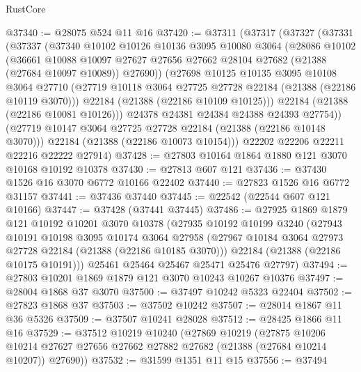 \begin{lexlean}{RustCore}
\begin{coremodule}
@37340 := @28075 @524 @11 @16
@37420 := @37311
    (@37317
      (@37327
        (@37331
          (@37337
            (@37340
              @10102
              @10126
              @10136
              @3095
              @10080
              @3064
              (@28086
                @10102
                (@36661
                  @10088
                  @10097
                  @27627
                  @27656
                  @27662
                  @28104
                  @27682
                  (@21388 (@27684 @10097 @10089))
                  @27690))
              (@27698
                @10125
                @10135
                @3095
                @10108
                @3064
                @27710
                (@27719 @10118 @3064 @27725 @27728 @22184 (@21388 (@22186 @10119 @3070)))
                @22184
                (@21388 (@22186 @10109 @10125)))
              @22184
              (@21388 (@22186 @10081 @10126)))
            @24378
            @24381
            @24384
            @24388
            @24393
            @27754))
        (@27719 @10147 @3064 @27725 @27728 @22184 (@21388 (@22186 @10148 @3070)))
        @22184
        (@21388 (@22186 @10073 @10154)))
      @22202
      @22206
      @22211
      @22216
      @22222
      @27914)
@37428 := @27803 @10164 @1864 @1880 @121 @3070 @10168 @10192 @10378
@37430 := @27813 @607 @121
@37436 := @37430 @1526 @16 @3070 @6772 @10166 @22402
@37440 := @27823 @1526 @16 @6772 @31157
@37441 := @37436 @37440
@37445 := @22542 (@22544 @607 @121 @10166)
@37447 := @37428 (@37441 @37445)
@37486 := @27925
    @1869
    @1879
    @121
    @10192
    @10201
    @3070
    @10378
    (@27935
      @10192
      @10199
      @3240
      (@27943
        @10191
        @10198
        @3095
        @10174
        @3064
        @27958
        (@27967 @10184 @3064 @27973 @27728 @22184 (@21388 (@22186 @10185 @3070)))
        @22184
        (@21388 (@22186 @10175 @10191)))
      @25461
      @25464
      @25467
      @25471
      @25476
      @27797)
@37494 := @27803 @10201 @1869 @1879 @121 @3070 @10243 @10267 @10376
@37497 := @28004 @1868 @37 @3070
@37500 := @37497 @10242 @5323 @22404
@37502 := @27823 @1868 @37
@37503 := @37502 @10242
@37507 := @28014 @1867 @11 @36 @5326
@37509 := @37507 @10241 @28028
@37512 := @28425 @1866 @11 @16
@37529 := @37512
    @10219
    @10240
    (@27869
      @10219
      (@27875
        @10206
        @10214
        @27627
        @27656
        @27662
        @27882
        @27682
        (@21388 (@27684 @10214 @10207))
        @27690))
@37532 := @31599 @1351 @11 @15
@37556 := @37494

\end{coremodule}
\end{lexlean}
